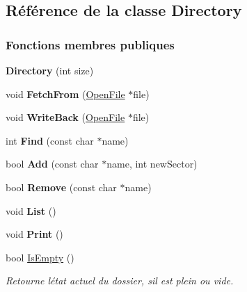 \hypertarget{class_directory}{}\subsection{Référence de la classe Directory}
\label{class_directory}
\subsubsection*{Fonctions membres publiques}
\begin{DoxyCompactItemize}
\item 
\hypertarget{class_directory_a77366fc5c4d73a3c20fc060640b1258a}{}\label{class_directory_a77366fc5c4d73a3c20fc060640b1258a} 
{\bfseries Directory} (int size)
\item 
\hypertarget{class_directory_a36ed455b21bbd9a66ffe8ec689ff7c73}{}\label{class_directory_a36ed455b21bbd9a66ffe8ec689ff7c73} 
void {\bfseries Fetch\+From} (\hyperlink{class_open_file}{Open\+File} $\ast$file)
\item 
\hypertarget{class_directory_abf5550df42587bbc604c71441a4d12fc}{}\label{class_directory_abf5550df42587bbc604c71441a4d12fc} 
void {\bfseries Write\+Back} (\hyperlink{class_open_file}{Open\+File} $\ast$file)
\item 
\hypertarget{class_directory_abfe376d1883918703cda2a6a4e23ffa8}{}\label{class_directory_abfe376d1883918703cda2a6a4e23ffa8} 
int {\bfseries Find} (const char $\ast$name)
\item 
\hypertarget{class_directory_aab3700537a499e57a07c79ba666d2fcb}{}\label{class_directory_aab3700537a499e57a07c79ba666d2fcb} 
bool {\bfseries Add} (const char $\ast$name, int new\+Sector)
\item 
\hypertarget{class_directory_a3ad4280cbe376ef803105e6a35856165}{}\label{class_directory_a3ad4280cbe376ef803105e6a35856165} 
bool {\bfseries Remove} (const char $\ast$name)
\item 
\hypertarget{class_directory_a5065793fb216a407cc3871dd3c837117}{}\label{class_directory_a5065793fb216a407cc3871dd3c837117} 
void {\bfseries List} ()
\item 
\hypertarget{class_directory_a40c728221c5557e4fc181c4091c6fcff}{}\label{class_directory_a40c728221c5557e4fc181c4091c6fcff} 
void {\bfseries Print} ()
\item 
bool \hyperlink{class_directory_a2f4299d8d962c0384f707274d7563932}{Is\+Empty} ()
\begin{DoxyCompactList}\small\item\em Retourne l\textquotesingle{}état actuel du dossier, s\textquotesingle{}il est plein ou vide. \end{DoxyCompactList}\end{DoxyCompactItemize}
